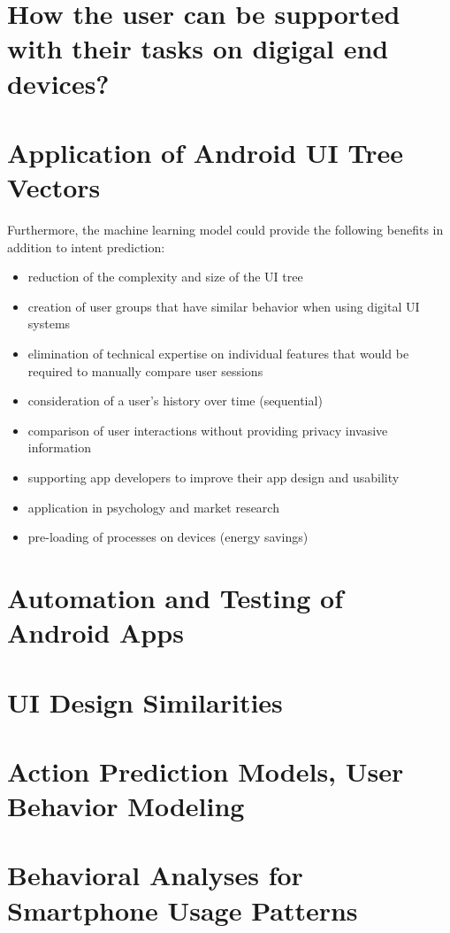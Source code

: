\section{How the user can be supported with their tasks on digigal end devices?}

\section{Application of Android UI Tree Vectors}


Furthermore, the machine learning model could provide the following benefits in addition to intent prediction:
\begin{itemize}
    \item reduction of the complexity and size of the UI tree
    \item creation of user groups that have similar behavior when using digital UI systems \cite{jayarajah2015need}
    \item elimination of technical expertise on individual features that would be required to manually compare user sessions \cite{ghods2019activity2vec}
    \item consideration of a user's history over time (sequential)
    \item comparison of user interactions without providing privacy invasive information
    \item supporting app developers to improve their app design and usability
    \item application in psychology and market research
    \item pre-loading of processes on devices (energy savings) \cite{shen2019deepapp}
\end{itemize}

\section{Automation and Testing of Android Apps}
\section{UI Design Similarities}
\section{Action Prediction Models, User Behavior Modeling}
\section{Behavioral Analyses for Smartphone Usage Patterns}

